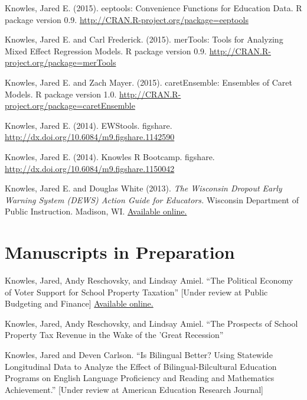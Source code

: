 \documentclass[margin,line]{res}
\begin{document}
\begin{resume}
Knowles, Jared E. (2015). eeptools: Convenience Functions for Education Data. R package
  version 0.9. \url{http://CRAN.R-project.org/package=eeptools}

Knowles, Jared E. and Carl Frederick. (2015). merTools: Tools for Analyzing Mixed 
Effect Regression Models. R package version 0.9. 
\url{http://CRAN.R-project.org/package=merTools}

Knowles, Jared E. and Zach Mayer. (2015). caretEnsemble: Ensembles of Caret Models. 
R package version 1.0. \url{http://CRAN.R-project.org/package=caretEnsemble}

Knowles, Jared E. (2014). EWStools. figshare. \url{http://dx.doi.org/10.6084/m9.figshare.1142590}

Knowles, Jared E. (2014). Knowles R Bootcamp. figshare. 
\url{http://dx.doi.org/10.6084/m9.figshare.1150042}

Knowles, Jared E. and Douglas White (2013). \emph{The Wisconsin Dropout Early 
Warning System (DEWS) Action Guide for Educators.} Wisconsin Department of Public 
Instruction. Madison, WI. \href{http://dpi.wi.gov/dews}{Available online.}

\section{\sc Manuscripts in Preparation}


Knowles, Jared, Andy Reschovsky, and Lindsay Amiel. ``The Political Economy of Voter Support for School Property Taxation'' [Under review at Public Budgeting and Finance]
\href{http://www.lafollette.wisc.edu/research-public-service/publications/the-political-economy-of-voter-support-for-school-property-taxation-v2}{Available online.}

Knowles, Jared, Andy Reschovsky, and Lindsay Amiel. ``The Prospects of School Property Tax Revenue in the Wake of the 'Great Recession'' 

Knowles, Jared and Deven Carlson. ``Is Bilingual Better? Using Statewide Longitudinal Data to Analyze the Effect of Bilingual-Bilcultural Education Programs on English Language Proficiency and Reading and Mathematics Achievement.'' [Under review at American Education Research Journal]
% 
% 


\end{resume}
\end{document}
